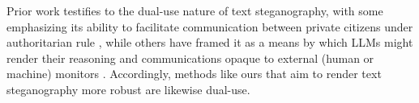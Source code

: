 Prior work testifies to the dual-use nature of text steganography, with some emphasizing its ability to facilitate communication between private citizens under authoritarian rule \citep{perry2025robust}, while others have framed it as a means by which LLMs might render their reasoning and communications opaque to external (human or machine) monitors \citep{lanham2023measuring, roger2023preventing, skaf2025large}. Accordingly, methods like ours that aim to render text steganography more robust are likewise dual-use.
